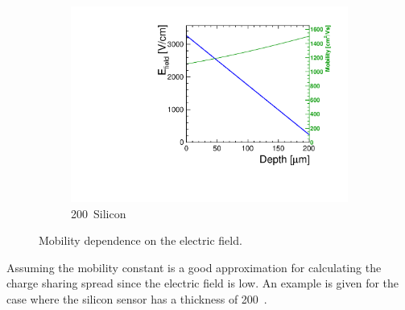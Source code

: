 \begin{figure}[htbp]
\begin{subfigure}[b]{0.33\textwidth}
    \includegraphics[width=\textwidth]{figures/ChargeSharing/Efield_mob_B06.pdf}
    \caption{200~\micron Silicon}\label{fig:Mob_Efield_B06}
  \end{subfigure} 
  \caption{Mobility dependence on the electric field.}\label{fig:Efield_mobility}
\end{figure}

Assuming the mobility constant is a good approximation for calculating
the charge sharing spread since the electric field is low. An example
is given for the case where the silicon sensor has a thickness of 200~\micron.

